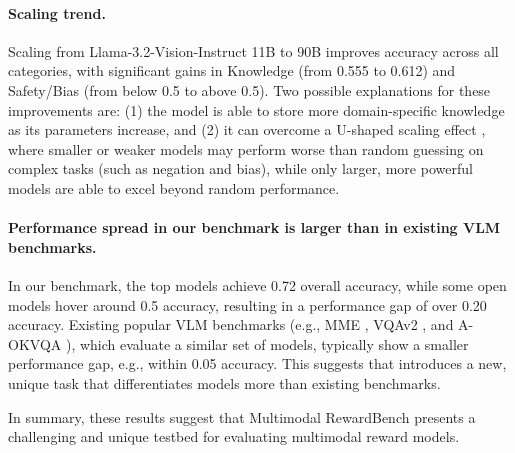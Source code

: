 \paragraph{Scaling trend.} Scaling from Llama-3.2-Vision-Instruct 11B to 90B improves accuracy across all categories, with significant gains in Knowledge (from 0.555 to 0.612) and Safety/Bias (from below 0.5 to above 0.5). Two possible explanations for these improvements are: (1) the model is able to store more domain-specific knowledge as its parameters increase, and (2) it can overcome a U-shaped scaling effect \citep{zhang2023beyond}, where smaller or weaker models may perform worse than random guessing on complex tasks (such as negation and bias), while only larger, more powerful models are able to excel beyond random performance.




\paragraph{Performance spread in our benchmark is larger than in existing VLM benchmarks.}
In our benchmark, the top models achieve 0.72 overall accuracy, while some open models hover around 0.5 accuracy, resulting in a performance gap of over 0.20 accuracy. 
Existing popular VLM benchmarks (e.g., MME \citealt{fu2023mme}, VQAv2 \citealt{vqav2}, and A-OKVQA \citealt{schwenk2022okvqa}), which evaluate a similar set of models, typically show a smaller performance gap, e.g., within 0.05 accuracy.
This suggests that \methodname introduces a new, unique task that differentiates models more than existing benchmarks.








In summary, these results suggest that Multimodal RewardBench presents a challenging and unique testbed for evaluating multimodal reward models.